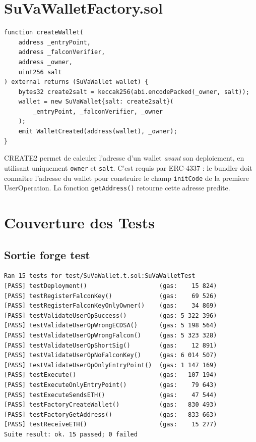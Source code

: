 \documentclass[11pt,a4paper]{article}
\begin{document}
\section{SuVaWalletFactory.sol}

\begin{lstlisting}[style=solidity, caption={Factory --- deploiement deterministe CREATE2}]
function createWallet(
    address _entryPoint,
    address _falconVerifier,
    address _owner,
    uint256 salt
) external returns (SuVaWallet wallet) {
    bytes32 create2salt = keccak256(abi.encodePacked(_owner, salt));
    wallet = new SuVaWallet{salt: create2salt}(
        _entryPoint, _falconVerifier, _owner
    );
    emit WalletCreated(address(wallet), _owner);
}
\end{lstlisting}

\begin{infobox}
CREATE2 permet de calculer l'adresse d'un wallet \textit{avant} son deploiement, en utilisant
uniquement \texttt{owner} et \texttt{salt}. C'est requis par ERC-4337 : le bundler doit connaitre
l'adresse du wallet pour construire le champ \texttt{initCode} de la premiere UserOperation.
La fonction \texttt{getAddress()} retourne cette adresse predite.
\end{infobox}

\section{Couverture des Tests}

\subsection{Sortie forge test}

\begin{lstlisting}[style=bash, caption={forge test --match-path test/SuVaWallet.t.sol -vv}]
Ran 15 tests for test/SuVaWallet.t.sol:SuVaWalletTest
[PASS] testDeployment()                    (gas:    15 824)
[PASS] testRegisterFalconKey()             (gas:    69 526)
[PASS] testRegisterFalconKeyOnlyOwner()    (gas:    34 869)
[PASS] testValidateUserOpSuccess()         (gas: 5 322 396)
[PASS] testValidateUserOpWrongECDSA()      (gas: 5 198 564)
[PASS] testValidateUserOpWrongFalcon()     (gas: 5 323 328)
[PASS] testValidateUserOpShortSig()        (gas:    12 891)
[PASS] testValidateUserOpNoFalconKey()     (gas: 6 014 507)
[PASS] testValidateUserOpOnlyEntryPoint()  (gas: 1 147 169)
[PASS] testExecute()                       (gas:   107 194)
[PASS] testExecuteOnlyEntryPoint()         (gas:    79 643)
[PASS] testExecuteSendsETH()               (gas:    47 544)
[PASS] testFactoryCreateWallet()           (gas:   830 493)
[PASS] testFactoryGetAddress()             (gas:   833 663)
[PASS] testReceiveETH()                    (gas:    15 277)
Suite result: ok. 15 passed; 0 failed
\end{lstlisting}
\end{document}
